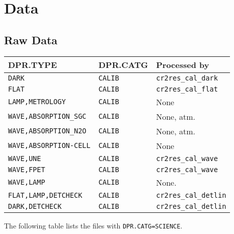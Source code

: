 \section{Data}
\label{sec:data}



\subsection{Raw Data}

\begin{tabularx}{\linewidth}{|X|X|X|}
    \hline
    \multicolumn{1}{|l|}{\textbf{DPR.TYPE}} &
    \multicolumn{1}{l|}{\textbf{DPR.CATG}} &
    \multicolumn{1}{l|}{\textbf{Processed by}}\\
    \hline
    \texttt{DARK}                   & \texttt{CALIB} & \texttt{cr2res\_cal\_dark} \\
    \texttt{FLAT}                   & \texttt{CALIB} & \texttt{cr2res\_cal\_flat} \\
    \texttt{LAMP,METROLOGY}         & \texttt{CALIB} & None \\
    \texttt{WAVE,ABSORPTION\_SGC}   & \texttt{CALIB} & None, atm. \\
    \texttt{WAVE,ABSORPTION\_N2O}   & \texttt{CALIB} & None, atm. \\
    \texttt{WAVE,ABSORPTION-CELL}   & \texttt{CALIB} & None \\
    \texttt{WAVE,UNE}               & \texttt{CALIB} & \texttt{cr2res\_cal\_wave} \\
    \texttt{WAVE,FPET}              & \texttt{CALIB} & \texttt{cr2res\_cal\_wave} \\
    \texttt{WAVE,LAMP}              & \texttt{CALIB} & None. \\
    \texttt{FLAT,LAMP,DETCHECK}     & \texttt{CALIB} & \texttt{cr2res\_cal\_detlin} \\
    \texttt{DARK,DETCHECK}          & \texttt{CALIB} & \texttt{cr2res\_cal\_detlin} \\
    \hline
\end{tabularx}
\label{tab:raw-calibs}


The following table lists the files with \verb!DPR.CATG=SCIENCE!.

